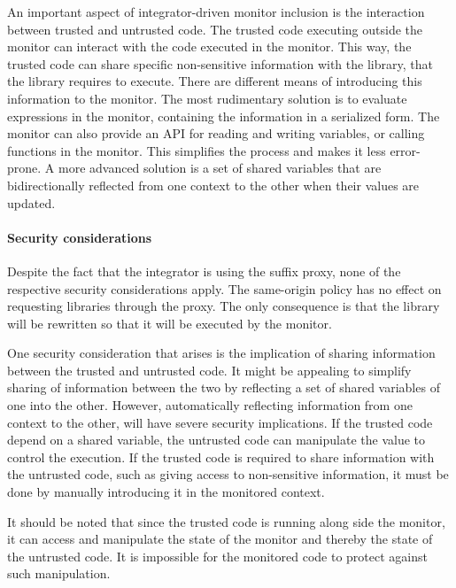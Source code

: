 \documentclass{llncs}
\newcommand{\todo}[1]{\colorbox{red}{\textcolor{white}{\sffamily\bfseries\scriptsize TODO}} \textcolor{red}{#1} \textcolor{red}{$\blacktriangleleft$}}
\begin{document}
An important aspect of integrator-driven monitor inclusion is the interaction 
between trusted and untrusted code. 
The trusted code executing outside the monitor can interact with the code 
executed in the monitor. This way, 
the trusted code can share specific non-sensitive information with the library, 
that the library requires to execute. There are different means of introducing this 
information to the monitor. The most rudimentary solution is to evaluate 
expressions in the monitor, containing the information in a serialized form.
The monitor can also provide an API for reading and writing variables, or 
calling functions in the monitor. This simplifies the process and
makes it less error-prone. A more advanced solution is a set of shared variables
that are bidirectionally reflected from one context to the other when 
their values are updated.


\paragraph{Security considerations}

Despite the fact that the integrator is using the suffix proxy, none of the 
respective security considerations apply. The same-origin policy has no effect 
on requesting libraries through the proxy. The only consequence is that the library
will be rewritten so that it will be executed by the monitor.

One security consideration that arises is the implication of sharing information between the 
trusted and untrusted code. It might be appealing to simplify sharing of 
information between the two by reflecting a set of shared variables of one into the other.
However, automatically 
reflecting information from one context to the other, will 
have severe security implications. If the trusted code depend on a 
shared variable, the untrusted code can manipulate the value to control the
execution.
If the trusted code is required to share information 
with the untrusted code, such as giving access to non-sensitive information, it 
must be done by manually introducing it in the monitored context.

It should be noted that since the trusted code is running along side the monitor, 
it can access and manipulate the state of the monitor and thereby the state of 
the untrusted code. It is impossible for the monitored code to protect against 
such manipulation.
\end{document}
